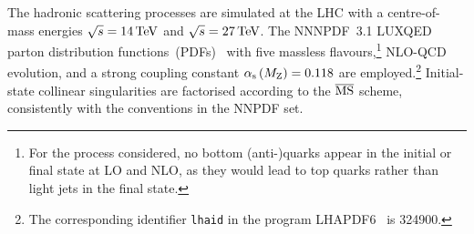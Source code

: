 \documentclass[11pt,epsf]{article}
\begin{document}
The hadronic scattering processes are simulated at the LHC with a centre-of-mass energies $\sqrt s = 14 \,\text{TeV}$ and $\sqrt s = 27 \,\text{TeV}$.
    The NNNPDF~3.1 LUXQED parton distribution
    functions~(PDFs)~\cite{Bertone:2017bme} with five massless
    flavours,\footnote{For the process considered, no bottom
      (anti-)quarks appear in the initial or final state at LO and
      NLO, as they would lead to top quarks rather than light jets in the final state.} 
    NLO-QCD evolution, and a strong coupling constant $\alpha_\text{s}\left( M_\text{Z} \right) = 0.118$ are employed.\footnote{The corresponding identifier {\tt lhaid} in the program LHAPDF6~\cite{Buckley:2014ana} is 324900.}
    Initial-state collinear singularities are factorised according to
    the ${\overline{\rm MS}}$ scheme, consistently with the conventions in the NNPDF set.
\end{document}
